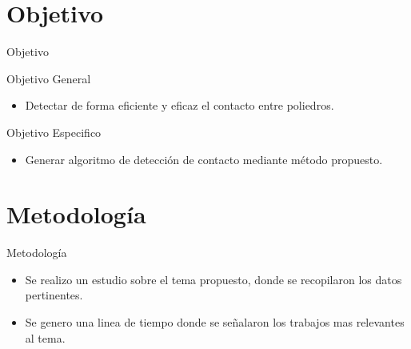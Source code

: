 \documentclass[11pt]{beamer}
\begin{document}
\section{Objetivo}
\begin{frame}{Objetivo}

\begin{block}{Objetivo General}
 \begin{itemize}
    \item Detectar de forma eficiente y eficaz el contacto entre poliedros.
 \end{itemize}
\end{block}

\begin{block}{Objetivo Especifico}
 \begin{itemize}
  \item Generar algoritmo de detección de contacto mediante método propuesto.
 \end{itemize}
\end{block}
\end{frame}     

\section{Metodología}
\begin{frame}{Metodología}
\begin{itemize}
    \item Se realizo un estudio sobre el tema propuesto, donde se recopilaron los datos pertinentes.
    \item Se genero una linea de tiempo donde se señalaron los trabajos mas relevantes al tema.
\end{itemize}
\end{frame}
\end{document}
